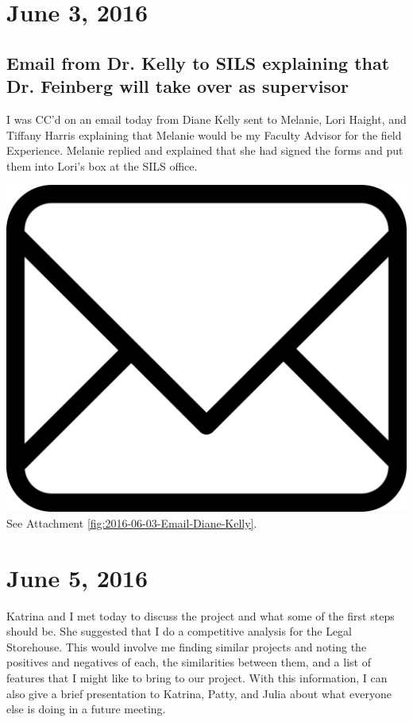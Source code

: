 \documentclass{article}
\begin{document}
\section{June 3, 2016}
\subsection{Email from Dr. Kelly to SILS explaining that Dr. Feinberg will take over as supervisor}
I was CC'd on an email today from Diane Kelly sent to Melanie, Lori Haight, and Tiffany Harris explaining that Melanie would be my Faculty Advisor for the field Experience. Melanie replied and explained that she had signed the forms and put them into Lori's box at the SILS office. 

\vspace{2em}
\noindent\includegraphics[height=\fontcharht\font`\B]{icons/attachment-email} See Attachment \ref{fig:2016-06-03-Email-Diane-Kelly}.
\vspace{2em}

\section{June 5, 2016}
Katrina and I met today to discuss the project and what some of the first steps should be. She suggested that I do a competitive analysis for the Legal Storehouse. This would involve me finding similar projects and noting the positives and negatives of each, the similarities between them, and a list of features that I might like to bring to our project. With this information, I can also give a brief presentation to Katrina, Patty, and Julia about what everyone else is doing in a future meeting.
\end{document}
